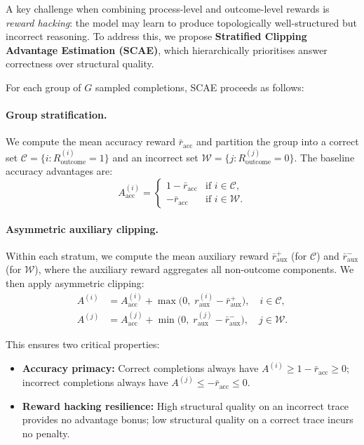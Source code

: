 A key challenge when combining process-level and outcome-level rewards
is \emph{reward hacking}: the model may learn to produce topologically
well-structured but incorrect reasoning. To address this, we propose
\textbf{Stratified Clipping Advantage Estimation (SCAE)}, which
hierarchically prioritises answer correctness over structural quality.

For each group of $G$ sampled completions, SCAE proceeds as follows:

\paragraph{Group stratification.}
We compute the mean accuracy reward $\bar{r}_{\mathrm{acc}}$ and
partition the group into a correct set
$\mathcal{C} = \{i : R_{\mathrm{outcome}}^{(i)} = 1\}$ and an incorrect
set $\mathcal{W} = \{j : R_{\mathrm{outcome}}^{(j)} = 0\}$. The
baseline accuracy advantages are:
\begin{equation}
\label{eq:a_acc}
A_{\mathrm{acc}}^{(i)} = \begin{cases}
    1 - \bar{r}_{\mathrm{acc}} & \text{if } i \in \mathcal{C}, \\
    -\bar{r}_{\mathrm{acc}} & \text{if } i \in \mathcal{W}.
\end{cases}
\end{equation}

\paragraph{Asymmetric auxiliary clipping.}
Within each stratum, we compute the mean auxiliary reward
$\bar{r}_{\mathrm{aux}}^{+}$ (for $\mathcal{C}$) and
$\bar{r}_{\mathrm{aux}}^{-}$ (for $\mathcal{W}$), where the auxiliary
reward aggregates all non-outcome components. We then apply asymmetric
clipping:
\begin{align}
A^{(i)} &= A_{\mathrm{acc}}^{(i)} + \max\!\big(0,\;
    r_{\mathrm{aux}}^{(i)} - \bar{r}_{\mathrm{aux}}^{+}\big),
    \quad i \in \mathcal{C}, \label{eq:a_correct} \\
A^{(j)} &= A_{\mathrm{acc}}^{(j)} + \min\!\big(0,\;
    r_{\mathrm{aux}}^{(j)} - \bar{r}_{\mathrm{aux}}^{-}\big),
    \quad j \in \mathcal{W}. \label{eq:a_wrong}
\end{align}

This ensures two critical properties:
\begin{itemize}[leftmargin=*,itemsep=1pt]
    \item \textbf{Accuracy primacy:} Correct completions always have
    $A^{(i)} \geq 1 - \bar{r}_{\mathrm{acc}} \geq 0$; incorrect
    completions always have $A^{(j)} \leq -\bar{r}_{\mathrm{acc}} \leq 0$.
    \item \textbf{Reward hacking resilience:} High structural quality on
    an incorrect trace provides no advantage bonus; low structural quality
    on a correct trace incurs no penalty.
\end{itemize}

